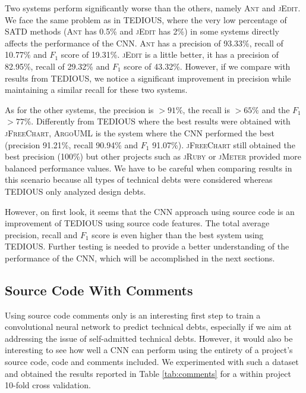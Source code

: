 Two systems perform significantly worse than the others, namely \textsc{Ant} and \textsc{jEdit}. We face the same problem as in TEDIOUS, where the very low percentage of SATD methods (\textsc{Ant} has 0.5\% and \textsc{jEdit} has 2\%) in some systems directly affects the performance of the CNN. \textsc{Ant} has a precision of 93.33\%, recall of 10.77\% and $F_1$ score of 19.31\%. \textsc{jEdit} is a little better, it has a precision of 82.95\%, recall of 29.32\% and $F_1$ score of 43.32\%. However, if we compare with results from TEDIOUS, we notice a significant improvement in precision while maintaining a similar recall for these two systems.

As for the other systems, the precision is $> 91\%$, the recall is $> 65\%$ and the $F_1$ $> 77\%$. Differently from TEDIOUS where the best results were obtained with \textsc{jFreeChart}, \textsc{ArgoUML} is the system where the CNN performed the best (precision 91.21\%, recall 90.94\% and $F_1$ 91.07\%). \textsc{jFreeChart} still obtained the best precision (100\%) but other projects such as \textsc{jRuby} or \textsc{jMeter} provided more balanced performance values. We have to be careful when comparing results in this scenario because all types of technical debts were considered whereas TEDIOUS only analyzed design debts. 

However, on first look, it seems that the CNN approach using source code is an improvement of TEDIOUS using source code features. The total average precision, recall and $F_1$ score is even higher than the best system using TEDIOUS. Further testing is needed to provide a better understanding of the performance of the CNN, which will be accomplished in the next sections.


\subsection{Source Code With Comments}


Using source code comments only is an interesting first step to train a convolutional neural network to predict technical debts, especially if we aim at addressing the issue of self-admitted technical debts. However, it would also be interesting to see how well a CNN can perform using the entirety of a project's source code, code and comments included. We experimented with such a dataset and obtained the results reported in Table \ref{tab:comments} for a within project 10-fold cross validation.

